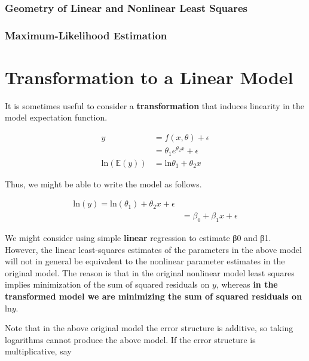 \documentclass[12pt]{article}
\begin{document}
\subsubsection*{Geometry of Linear and Nonlinear Least Squares}



\subsubsection*{Maximum-Likelihood Estimation}




\section{Transformation to a Linear Model}

It is sometimes useful to consider a \textbf{transformation} that induces linearity in the model expectation function. 


$$
\begin{aligned}
y &= f(x, \theta) + \epsilon \\
&= \theta_1 e^{\theta_2 x} + \epsilon \\[10pt]
\mathrm{ln}\left( \mathbb{E}(y) \right) &= \mathrm{ln} \theta_1 + \theta_2 x
\end{aligned}
$$

Thus, we might be able to write the model as follows.

$$
\begin{aligned}
\mathrm{ln}(y) = \mathrm{ln}(\theta_1) + \theta_2 x + \epsilon \\
&= \beta_0 + \beta_1 x + \epsilon
\end{aligned}
$$

We might consider using simple \textbf{linear} regression to estimate β0 and β1. However, the linear least-squares estimates of the parameters in the above model will not in general be equivalent to the nonlinear parameter estimates in the original model. The reason is that in the original nonlinear model least squares implies minimization of the sum of squared residuals on $y$, whereas \textbf{in the transformed model we are minimizing the sum of squared residuals on $\mathrm{ln} y$}.

Note that in the above original model the error structure is additive, so taking logarithms cannot produce the above model. If the error structure is multiplicative, say
\end{document}
